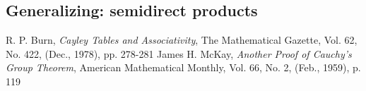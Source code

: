 \documentclass[letterpaper]{article}
\begin{document}
\subsection{Generalizing: semidirect products}

\begin{thebibliography}{7}
 R. P. Burn, \emph{Cayley Tables and Associativity},
The Mathematical Gazette, Vol. 62, No. 422, (Dec., 1978), pp. 278-281
 James H. McKay, \emph{Another Proof of Cauchy's Group Theorem}, American Mathematical Monthly, Vol. 66, No. 2, (Feb., 1959), p. 119
\end{thebibliography}
\end{document}
